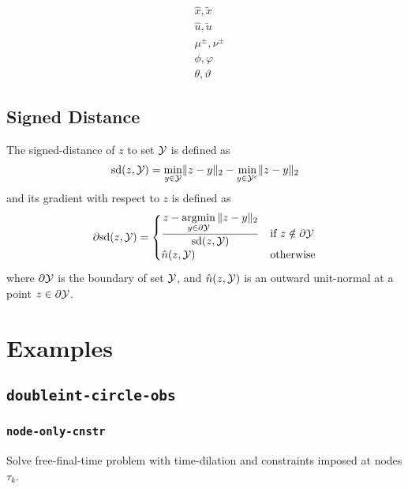 \documentclass[11pt,a4paper]{article}
\begin{document}
\begin{align}
    & \hat{x}, \tilde{x}\\
    & \hat{u}, \tilde{u}\\
    & \mu^{\pm}, \nu^{\pm}\\
    & \phi, \varphi\\
    & \theta, \vartheta 
\end{align}

\subsection{Signed Distance}

The signed-distance of $z$ to set $\mathcal{Y}$ is defined as
\begin{align}
    \mathrm{sd}(z,\mathcal{Y}) = \underset{y\in\mathcal{Y}}{\mathrm{min}}\|z-y\|_2 - \underset{y\in\mathcal{Y}^c}{\mathrm{min}}\|z-y\|_2\label{sgn-dist}
\end{align}
and its gradient with respect to $z$ is defined as 
\begin{align}
    \partial\mathrm{sd}(z,\mathcal{Y}) = \begin{cases}\displaystyle\frac{z-\underset{y\in\partial\mathcal{Y}}{\mathrm{argmin}}\,\|z-y\|_2}{\mathrm{sd}(z,\mathcal{Y})} &\text{if }z\notin\partial\mathcal{Y}\\\hat{n}(z,\mathcal{Y}) &\text{otherwise}\end{cases}\label{sgn-dist-jac}
\end{align}
where $\partial \mathcal{Y}$ is the boundary of set $\mathcal{Y}$, and $\hat{n}(z,\mathcal{Y})$ is an outward unit-normal at a point $z\in\partial\mathcal{Y}$.

\section{Examples}

\subsection{\texttt{doubleint-circle-obs}}

\subsubsection{\texttt{node-only-cnstr}}
%
Solve free-final-time problem with time-dilation and constraints imposed at nodes $\tau_k$.
\end{document}
